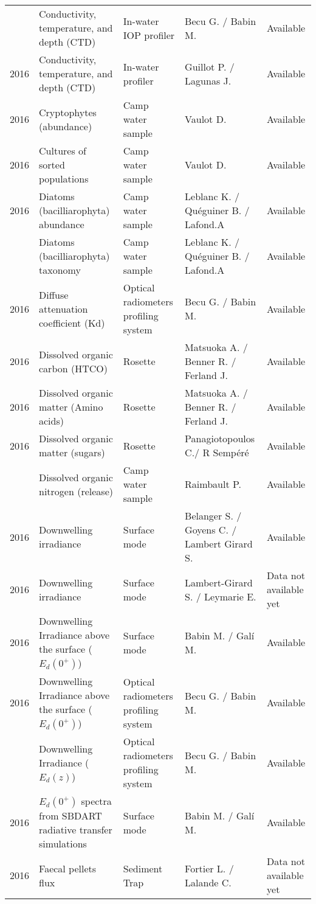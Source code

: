 \documentclass[]{article}
\begin{document}
\begin{landscape}
\begin{longtable}[t]{rllll}
\addlinespace
2016 & Conductivity, temperature, and depth (CTD) & In-water IOP profiler & Becu G. / Babin M. & Available\\
2016 & Conductivity, temperature, and depth (CTD) & In-water profiler & Guillot P. / Lagunas J. & Available\\
2016 & Cryptophytes (abundance) & Camp water sample & Vaulot D. & Available\\
2016 & Cultures of sorted populations & Camp water sample & Vaulot D. & Available\\
2016 & Diatoms (bacilliarophyta) abundance & Camp water sample & Leblanc K. / Quéguiner B. / Lafond.A & Available\\
\addlinespace
2016 & Diatoms (bacilliarophyta) taxonomy & Camp water sample & Leblanc K. / Quéguiner B. / Lafond.A & Available\\
2016 & Diffuse attenuation coefficient (Kd) & Optical radiometers profiling system & Becu G. / Babin M. & Available\\
2016 & Dissolved organic carbon (HTCO) & Rosette & Matsuoka A. / Benner R. / Ferland J. & Available\\
2016 & Dissolved organic matter (Amino acids) & Rosette & Matsuoka A. / Benner R. / Ferland J. & Available\\
2016 & Dissolved organic matter (sugars) & Rosette & Panagiotopoulos C./ R Sempéré & Available\\
\addlinespace
2016 & Dissolved organic nitrogen (release) & Camp water sample & Raimbault P. & Available\\
2016 & Downwelling irradiance & Surface mode & Belanger S. / Goyens C. / Lambert Girard S. & Available\\
2016 & Downwelling irradiance & Surface mode & Lambert-Girard S. / Leymarie E. & Data not available yet\\
2016 & Downwelling Irradiance above the surface ($E_d(0^+)$) & Surface mode & Babin M. / Galí M. & Available\\
2016 & Downwelling Irradiance above the surface ($E_d(0^+)$) & Optical radiometers profiling system & Becu G. / Babin M. & Available\\
\addlinespace
2016 & Downwelling Irradiance ($E_d(z)$) & Optical radiometers profiling system & Becu G. / Babin M. & Available\\
2016 & $E_d(0^+)$ spectra from SBDART radiative transfer simulations & Surface mode & Babin M. / Galí M. & Available\\
2016 & Faecal pellets flux & Sediment Trap & Fortier L. / Lalande C. & Data not available yet\\

\end{longtable}
\end{landscape}
\end{document}
